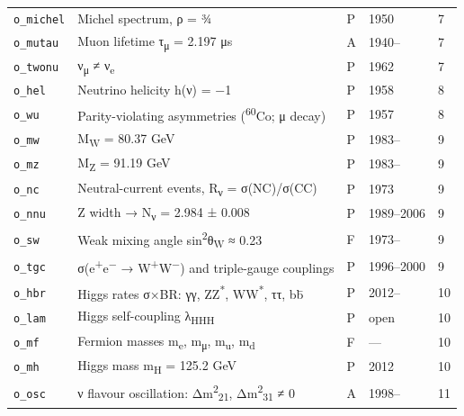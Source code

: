 \begin{longtable}{@{}l>{\raggedright\arraybackslash}p{7.6cm}lll@{}}
\texttt{o\_michel} & Michel spectrum, ρ = ¾ & P & 1950 & 7\\
\texttt{o\_mutau} & Muon lifetime τ\textsubscript{μ} = 2.197 μs & A & 1940– & 7\\
\texttt{o\_twonu} & ν\textsubscript{μ} ≠ ν\textsubscript{e} & P & 1962 & 7\\
\texttt{o\_hel} & Neutrino helicity h(ν) = −1 & P & 1958 & 8\\
\texttt{o\_wu} & Parity-violating asymmetries (\textsuperscript{60}Co; μ decay) & P & 1957 & 8\\
\texttt{o\_mw} & M\textsubscript{W} = 80.37 GeV & P & 1983– & 9\\
\texttt{o\_mz} & M\textsubscript{Z} = 91.19 GeV & P & 1983– & 9\\
\texttt{o\_nc} & Neutral-current events, R\textsubscript{ν} = σ(NC)/σ(CC) & P & 1973 & 9\\
\texttt{o\_nnu} & Z width → N\textsubscript{ν} = 2.984 ± 0.008 & P & 1989–2006 & 9\\
\texttt{o\_sw} & Weak mixing angle sin\textsuperscript{2}θ\textsubscript{W} ≈ 0.23 & F & 1973– & 9\\
\texttt{o\_tgc} & σ(e\textsuperscript{+}e\textsuperscript{−} → W\textsuperscript{+}W\textsuperscript{−}) and triple-gauge couplings & P & 1996–2000 & 9\\
\texttt{o\_hbr} & Higgs rates σ×BR: γγ, ZZ\textsuperscript{*}, WW\textsuperscript{*}, ττ, bb̄ & P & 2012– & 10\\
\texttt{o\_lam} & Higgs self-coupling λ\textsubscript{HHH} & P & open & 10\\
\texttt{o\_mf} & Fermion masses m\textsubscript{e}, m\textsubscript{μ}, m\textsubscript{u}, m\textsubscript{d} & F & — & 10\\
\texttt{o\_mh} & Higgs mass m\textsubscript{H} = 125.2 GeV & P & 2012 & 10\\
\texttt{o\_osc} & ν flavour oscillation: Δm\textsuperscript{2}\textsubscript{21}, Δm\textsuperscript{2}\textsubscript{31} ≠ 0 & A & 1998– & 11\\
\end{longtable}
